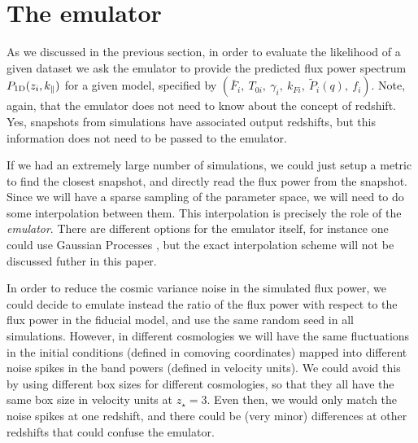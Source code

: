\section{The emulator} \label{sec:emu}

As we discussed in the previous section, in order to evaluate the
likelihood of a given dataset we ask the emulator to provide the predicted
flux power spectrum $P_{\rm 1D}(z_i,k_\parallel)$ for a given model,
specified by 
$\left( \bar F_i,~T_{0i},~\gamma_i,~k_{Fi},~\tilde P_i(q),~f_i \right)$.
Note, again, that the emulator does not need to know about the concept of
redshift.
Yes, snapshots from simulations have associated output redshifts, but this
information does not need to be passed to the emulator.


If we had an extremely large number of simulations, we could just setup a
metric to find the closest snapshot, and directly read the flux power
from the snapshot.
Since we will have a sparse sampling of the parameter space, we will need
to do some interpolation between them. 
This interpolation is precisely the role of the \textit{emulator}.
There are different options for the emulator itself, for instance one could
use Gaussian Processes \cite{Heitmann2009,Heitmann2014,SLAC2018,
Walther2018a,Bird2018,Rogers2018c}, but the exact interpolation scheme will
not be discussed futher in this paper.

In order to reduce the cosmic variance noise in the simulated flux power,
we could decide to emulate instead the ratio of the flux power with respect
to the flux power in the fiducial model, and use the same random seed in all
simulations.
However, in different cosmologies we will have the same fluctuations in the
initial conditions (defined in comoving coordinates) mapped into different 
noise spikes in the band powers (defined in velocity units).
We could avoid this by using different box sizes for different cosmologies,
so that they all have the same box size in velocity units at $z_\star=3$.
Even then, we would only match the noise spikes at one redshift, and there
could be (very minor) differences at other redshifts that could confuse
the emulator.

